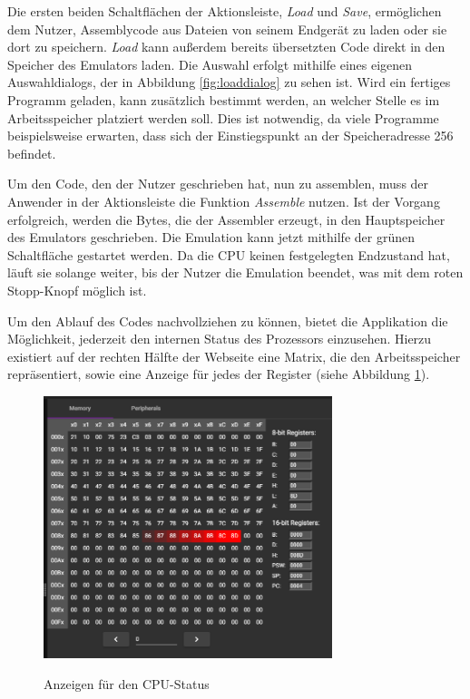 Die ersten beiden Schaltflächen der Aktionsleiste, \textit{Load} und \textit{Save}, ermöglichen dem Nutzer, Assemblycode aus Dateien von seinem Endgerät zu laden oder sie dort zu speichern. \textit{Load} kann außerdem bereits übersetzten Code direkt in den Speicher des Emulators laden. Die Auswahl erfolgt mithilfe eines eigenen Auswahldialogs, der in Abbildung \ref{fig:loaddialog} zu sehen ist. Wird ein fertiges Programm geladen, kann zusätzlich bestimmt werden, an welcher Stelle es im Arbeitsspeicher platziert werden soll. Dies ist notwendig, da viele Programme beispielsweise erwarten, dass sich der Einstiegspunkt an der Speicheradresse 256 befindet.

Um den Code, den der Nutzer geschrieben hat, nun zu assemblen, muss der Anwender in der Aktionsleiste die Funktion \textit{Assemble} nutzen. Ist der Vorgang erfolgreich, werden die Bytes, die der Assembler erzeugt, in den Hauptspeicher des Emulators geschrieben. Die Emulation kann jetzt mithilfe der grünen Schaltfläche gestartet werden. Da die \ac{CPU} keinen festgelegten Endzustand hat, läuft sie solange weiter, bis der Nutzer die Emulation beendet, was mit dem roten Stopp-Knopf möglich ist.

Um den Ablauf des Codes nachvollziehen zu können, bietet die Applikation die Möglichkeit, jederzeit den internen Status des Prozessors einzusehen. Hierzu existiert auf der rechten Hälfte der Webseite eine Matrix, die den Arbeitsspeicher repräsentiert, sowie eine Anzeige für jedes der Register (siehe Abbildung \ref{fig:cpustate}).

\begin{figure}
    \caption{Anzeigen für den CPU-Status}
    \centering
    \includegraphics[width=0.75\textwidth]{Bilder/CPUState.png}
    \label{fig:cpustate}
\end{figure}

